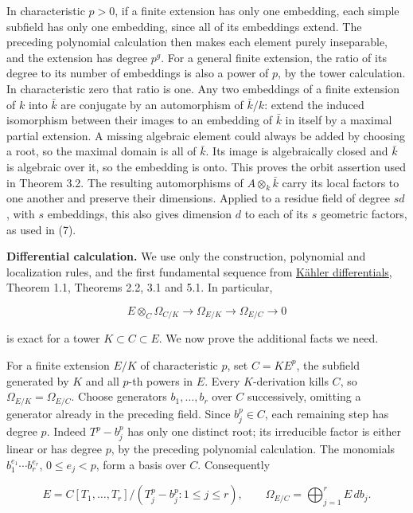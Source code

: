 \documentclass[
]{article}
\begin{document}
In characteristic \(p>0\), if a finite extension has only one embedding,
each simple subfield has only one embedding, since all of its embeddings
extend. The preceding polynomial calculation then makes each element
purely inseparable, and the extension has degree \(p^g\). For a general
finite extension, the ratio of its degree to its number of embeddings is
also a power of \(p\), by the tower calculation. In characteristic zero
that ratio is one. Any two embeddings of a finite extension of \(k\)
into \(\bar k\) are conjugate by an automorphism of \(\bar k/k\): extend
the induced isomorphism between their images to an embedding of
\(\bar k\) in itself by a maximal partial extension. A missing algebraic
element could always be added by choosing a root, so the maximal domain
is all of \(\bar k\). Its image is algebraically closed and \(\bar k\)
is algebraic over it, so the embedding is onto. This proves the orbit
assertion used in Theorem 3.2. The resulting automorphisms of
\(A\otimes_k\bar k\) carry its local factors to one another and preserve
their dimensions. Applied to a residue field of degree \(sd\), with
\(s\) embeddings, this also gives dimension \(d\) to each of its \(s\)
geometric factors, as used in (7).

\textbf{Differential calculation.} We use only the construction,
polynomial and localization rules, and the first fundamental sequence
from \href{../prerequisites/AG-CA/AG-CA-16.html}{Kähler differentials},
Theorem 1.1, Theorems 2.2, 3.1 and 5.1. In particular,

\[
E\otimes_C\Omega_{C/K}\longrightarrow\Omega_{E/K}
\longrightarrow\Omega_{E/C}\longrightarrow0
\]

is exact for a tower \(K\subset C\subset E\). We now prove the
additional facts we need.

For a finite extension \(E/K\) of characteristic \(p\), set \(C=K E^p\),
the subfield generated by \(K\) and all \(p\)-th powers in \(E\). Every
\(K\)-derivation kills \(C\), so \(\Omega_{E/K}=\Omega_{E/C}\). Choose
generators \(b_1,\ldots,b_r\) over \(C\) successively, omitting a
generator already in the preceding field. Since \(b_j^p\in C\), each
remaining step has degree \(p\). Indeed \(T^p-b_j^p\) has only one
distinct root; its irreducible factor is either linear or has degree
\(p\), by the preceding polynomial calculation. The monomials
\(b_1^{e_1}\cdots b_r^{e_r}\), \(0\le e_j<p\), form a basis over \(C\).
Consequently

\[
E=C[T_1,\ldots,T_r]/(T_j^p-b_j^p:1\le j\le r),
\qquad \Omega_{E/C}=\bigoplus_{j=1}^r E\,db_j.
\]
\end{document}
